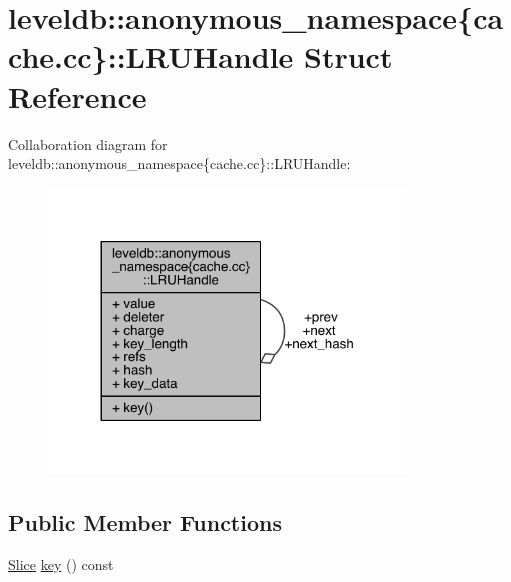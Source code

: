 \hypertarget{structleveldb_1_1anonymous__namespace_02cache_8cc_03_1_1_l_r_u_handle}{}\section{leveldb\+:\+:anonymous\+\_\+namespace\{cache.\+cc\}\+:\+:L\+R\+U\+Handle Struct Reference}
\label{structleveldb_1_1anonymous__namespace_02cache_8cc_03_1_1_l_r_u_handle}


Collaboration diagram for leveldb\+:\+:anonymous\+\_\+namespace\{cache.\+cc\}\+:\+:L\+R\+U\+Handle\+:
\nopagebreak
\begin{figure}[H]
\begin{center}
\leavevmode
\includegraphics[width=269pt]{structleveldb_1_1anonymous__namespace_02cache_8cc_03_1_1_l_r_u_handle__coll__graph}
\end{center}
\end{figure}
\subsection*{Public Member Functions}
\begin{DoxyCompactItemize}
\item 
\hyperlink{classleveldb_1_1_slice}{Slice} \hyperlink{structleveldb_1_1anonymous__namespace_02cache_8cc_03_1_1_l_r_u_handle_a1f201e893258f5c7866a2d413f55b6df}{key} () const 
\end{DoxyCompactItemize}
